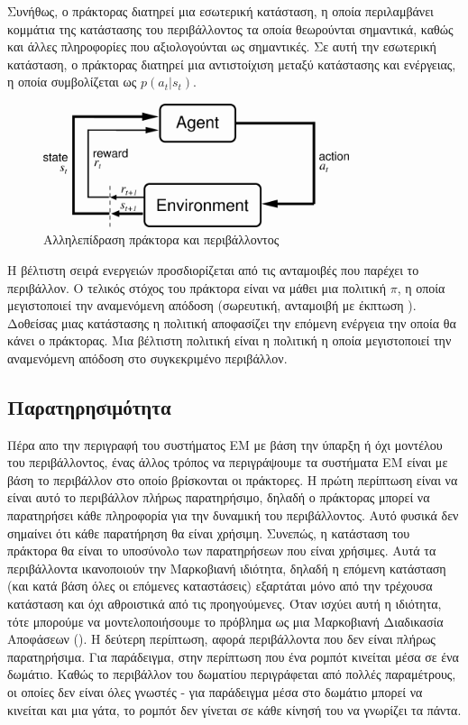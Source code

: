 Συνήθως, ο πράκτορας διατηρεί μια εσωτερική κατάσταση, η οποία περιλαμβάνει κομμάτια της κατάστασης του περιβάλλοντος τα οποία θεωρούνται
σημαντικά, καθώς και άλλες πληροφορίες που αξιολογούνται ως σημαντικές. Σε αυτή την εσωτερική κατάσταση, ο πράκτορας
διατηρεί μια αντιστοίχιση μεταξύ κατάστασης και ενέργειας, η οποία συμβολίζεται ως $p(a_t | s_t)$.

\begin{figure}[ht]
    \includegraphics[width=0.8\textwidth]{body_matter/reinforcement_learning/images/agent_environment.png}
    \Centering
    \caption{Αλληλεπίδραση πράκτορα και περιβάλλοντος}
    \label{fig:agent_environment}
\end{figure}


Η βέλτιστη σειρά ενεργειών προσδιορίζεται από τις ανταμοιβές που παρέχει το περιβάλλον. Ο τελικός στόχος του πράκτορα είναι να μάθει μια
πολιτική $π$, η οποία μεγιστοποιεί την αναμενόμενη απόδοση (σωρευτική, ανταμοιβή με έκπτωση ). Δοθείσας μιας κατάστασης
η πολιτική αποφασίζει την επόμενη ενέργεια την οποία θα κάνει ο πράκτορας. Μια βέλτιστη πολιτική είναι η πολιτική η οποία μεγιστοποιεί
την αναμενόμενη απόδοση στο συγκεκριμένο περιβάλλον.


\subsection{Παρατηρησιμότητα}

Πέρα απο την περιγραφή του συστήματος ΕΜ με βάση την ύπαρξη ή όχι μοντέλου του περιβάλλοντος, ένας
άλλος τρόπος να περιγράψουμε τα συστήματα ΕΜ είναι με βάση το περιβάλλον στο οποίο βρίσκονται οι πράκτορες.
Η πρώτη περίπτωση είναι να είναι αυτό το περιβάλλον πλήρως παρατηρήσιμο, δηλαδή ο πράκτορας μπορεί να παρατηρήσει κάθε πληροφορία για την δυναμική του περιβάλλοντος.
Αυτό φυσικά δεν σημαίνει ότι κάθε παρατήρηση θα είναι χρήσιμη. Συνεπώς, η κατάσταση του πράκτορα θα είναι το υποσύνολο των παρατηρήσεων που είναι χρήσιμες.
Αυτά τα περιβάλλοντα ικανοποιούν την Μαρκοβιανή ιδιότητα, δηλαδή η επόμενη κατάσταση (και κατά βάση όλες οι επόμενες καταστάσεις) εξαρτάται μόνο από
την τρέχουσα κατάσταση και όχι αθροιστικά από τις προηγούμενες. Όταν ισχύει αυτή η ιδιότητα, τότε μπορούμε να μοντελοποιήσουμε το πρόβλημα ως μια
Μαρκοβιανή Διαδικασία Αποφάσεων (). Η δεύτερη περίπτωση, αφορά περιβάλλοντα που δεν είναι πλήρως
παρατηρήσιμα. Για παράδειγμα, στην περίπτωση που ένα ρομπότ κινείται μέσα σε ένα δωμάτιο. Καθώς το περιβάλλον του δωματίου περιγράφεται
από πολλές παραμέτρους, οι οποίες δεν είναι όλες γνωστές - για παράδειγμα μέσα στο δωμάτιο μπορεί να κινείται και μια γάτα,
το ρομπότ δεν γίνεται σε κάθε κίνησή του να γνωρίζει τα πάντα.

